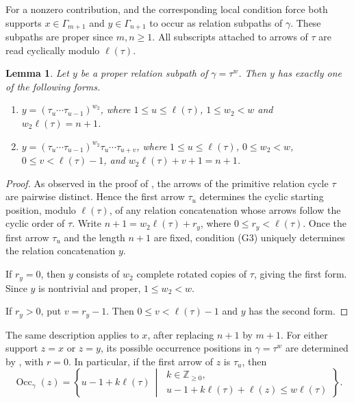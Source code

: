 \documentclass[11pt,a4paper,reqno]{amsart}
\newcommand{\Occ}{\operatorname{Occ}}
\theoremstyle{plain}
\newtheorem{lemma}[lemma]{Lemma}
\theoremstyle{definition}
\numberwithin{equation}{section}
\begin{document}
	For a nonzero contribution,  and the corresponding local
	condition force both supports $x\in\Gamma_{m+1}$ and $y\in\Gamma_{n+1}$
	to occur as relation subpaths of $\gamma$.  These subpaths are proper since
	$m,n\geq1$.  All subscripts attached to arrows of $\tau$ are read cyclically
	modulo $\ell(\tau)$.
	\begin{lemma}
		\label{lem:proper-subpaths-cycle-power}
		Let $y$ be a proper relation subpath of
		$\gamma=\tau^w$.
		Then $y$ has exactly one of the following forms.
		
		\begin{enumerate}
			\item
			$y=(\tau_u\cdots\tau_{u-1})^{w_2}$,
			where
			$1\leq u\leq\ell(\tau)$,
			$1\leq w_2<w$ and
			$w_2\ell(\tau)=n+1$.
			
			\item
			$y=(\tau_u\cdots\tau_{u-1})^{w_2}
			\tau_u\cdots\tau_{u+v}$,
			where
			$1\leq u\leq\ell(\tau)$,
			$0\leq w_2<w$,
			$0\leq v<\ell(\tau)-1$,
			and
			$w_2\ell(\tau)+v+1=n+1$.
		\end{enumerate}
	\end{lemma}
	
	\begin{proof}
		As observed in the proof of , the arrows of the
		primitive relation cycle $\tau$ are pairwise distinct. Hence the first
		arrow $\tau_u$ determines the cyclic starting position, modulo $\ell(\tau)$,
		of any relation concatenation whose arrows follow the cyclic order of $\tau$.
		Write $n+1=w_2\ell(\tau)+r_y$, where
		$0\leq r_y<\ell(\tau)$.
		Once the first arrow $\tau_u$ and the length $n+1$ are fixed, condition
		\textup{(G3)} uniquely determines the relation concatenation $y$.
		
		If $r_y=0$, then $y$ consists of $w_2$ complete rotated copies of
		$\tau$, giving the first form.  Since $y$ is nontrivial and proper, $1\leq w_2<w$.
		
		If $r_y>0$, put $v=r_y-1$.
		Then $0\leq v<\ell(\tau)-1$
		and $y$ has the second form.
	\end{proof}
	
	The same description applies to $x$, after replacing $n+1$ by $m+1$.
	For either support $z=x$ or $z=y$, its possible occurrence positions in
	$\gamma=\tau^w$ are determined by
	, with $r=0$.  In particular, if the first
	arrow of $z$ is $\tau_u$, then
	\[
	\Occ_\gamma(z)
	=
	\left\{
	u-1+k\ell(\tau)
	\ \middle|\
	\begin{array}{l}
		k\in\mathbb Z_{\geq0},\\[1mm]
		u-1+k\ell(\tau)+\ell(z)
		\leq w\ell(\tau)
	\end{array}
	\right\}.
	\]
	
\end{document}
